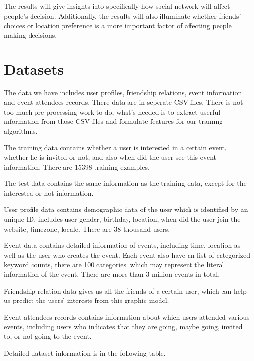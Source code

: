 \documentclass{article} %
\begin{document}
The results will give insights into specifically how social network will affect people's decision. Additionally, the results will also illuminate whether friends' choices or location preference is a more important factor of affecting people making decisions.

\section{Datasets}
The data we have includes user profiles, friendship relations, event information and event attendees records. There data are in seperate CSV files. There is not too much pre-processing work to do, what's needed is to extract userful information from those CSV files and formulate features for our training algorithms.

The training data contains whether a user is interested in a certain event, whether he is invited or not, and also when did the user see this event information. There are 15398 training examples.

The test data contains the same information as the training data, except for the interested or not information.

User profile data contains demographic data of the user which is identified by an unique ID, includes user gender, birthday, location, when did the user join the website, timezone, locale. There are 38 thousand users.

Event data contains detailed information of events, including time, location as well as the user who creates the event. Each event also have an list of categorized keyword counts, there are 100 categories, which may represent the literal information of the event.  There are more than 3 million events in total.

Friendship relation data gives us all the friends of a certain user, which can help us predict the users' interests from this graphic model. 

Event attendees records contains information about which users attended various events, including users who indicates that they are going, maybe going, invited to, or not going to the event.

Detailed dataset information is in the following table.
\end{document}
